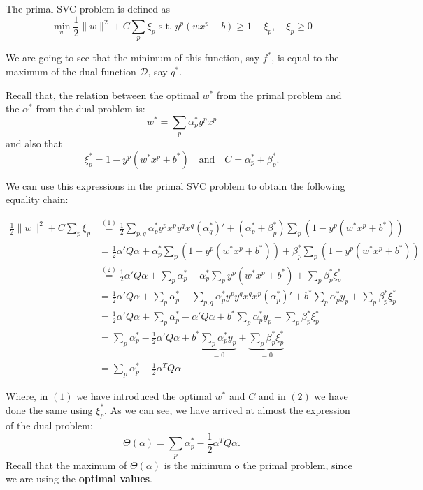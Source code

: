 \documentclass[11pt,table]{article}
\newcommand\norm[1]{\lVert#1\rVert}
\begin{document}
The primal SVC problem is defined as
\[
	\min_w \frac{1}{2}\norm{w}^2 + C \sum_p \xi_p \text{ s.t. } y^p(wx^p + b) \geq 1 - \xi_p,\quad \xi_p \geq 0
\]

We are going to see that the minimum of this function, say \(f^*\), is equal to the maximum of the dual function \(\mathcal D\), say \(q^*\).


Recall that, the relation between the optimal \(w^*\) from the primal problem and the \(\alpha^*\) from the dual problem is:
\[
	w^* = \sum_p \alpha^*_p y^p x^p
\]
and also that
\[
	\xi_p^* = 1-y^p(w^*x^p + b^*) \quad \text{and} \quad C = \alpha^*_p + \beta^*_p.
\]

We can use this expressions in the primal SVC problem to obtain the following equality chain:

\begin{align*}
	\frac{1}{2}\norm{w}^2 + C \sum_p \xi_p & \stackrel{(1)}{=} \frac{1}{2} \sum_{p,q} \alpha^*_p y^p x^p y^q x^q (\alpha^*_q)'  + (\alpha^*_p + \beta^*_p)\sum_p(1 - y^p(w^*x^p + b^*))                       \\
	                                       & = \frac{1}{2}\alpha ' Q \alpha + \alpha^*_p \sum_p(1 - y^p(w^*x^p + b^*)) + \beta^*_p \sum_p(1 - y^p(w^*x^p + b^*))                                              \\
	                                       & \stackrel{(2)}{=} \frac{1}{2}\alpha ' Q \alpha  + \sum_p \alpha^*_p -  \alpha^*_p\sum_p  y^p (w^*x^p + b^*) + \sum_p \beta^*_p \xi^*_p                           \\
	                                       & = \frac{1}{2}\alpha ' Q \alpha  + \sum_p \alpha^*_p - \sum_{p,q} \alpha_p^* y^p y^q x^q x^p (\alpha_p^*) ' + b^*\sum_p \alpha_p^* y_p + \sum_p \beta^*_p \xi^*_p \\
	                                       & = \frac{1}{2}\alpha ' Q \alpha  + \sum_p \alpha^*_p - \alpha ' Q \alpha + b^*\sum_p \alpha_p^* y_p + \sum_p \beta^*_p \xi^*_p                                    \\
	                                       & = \sum_p \alpha^*_p - \frac{1}{2}\alpha ' Q \alpha + b^*\underbrace{\sum_p \alpha_p^* y_p}_{= 0} + \underbrace{\sum_p \beta^*_p \xi^*_p}_{= 0}                   \\
	                                       & = \sum_p \alpha^*_p - \frac{1}{2}\alpha^T Q \alpha
\end{align*}

Where, in \((1)\) we have introduced the optimal \(w^*\) and \(C\) and in \((2)\) we have done the same using \(\xi_p^*\). As we can see, we have arrived at almost the expression of the dual problem:
\[
	\Theta (\alpha) = \sum_p \alpha^*_p - \frac{1}{2}\alpha^T Q \alpha.
\]
Recall that the maximum of \(\Theta(\alpha)\) is the minimum o the primal problem, since we are using the \textbf{optimal values}.
\end{document}
